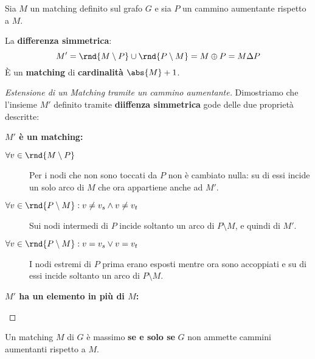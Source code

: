 \documentclass[\main/main.tex]{subfiles}
\begin{document}
\begin{theorem}
	Sia \(M\) un matching definito sul grafo \(G\) e sia \(P\) un cammino aumentante rispetto a \(M\).

	La \textbf{differenza simmetrica}:
	\[
		M' = \rnd{M\setminus P} \cup \rnd{P\setminus M} = M \oplus P = M \Delta P
	\]
	È un \textbf{matching} di \textbf{cardinalità} \(\abs{M} + 1\).
\end{theorem}

\begin{proof}[Estensione di un Matching tramite un cammino aumentante]
	Dimostriamo che l'insieme \(M'\) definito tramite \textbf{diiffenza simmetrica} gode delle due proprietà descritte:
	\begin{description}
		\item \textbf{\(M'\) è un matching:}
		      \begin{description}
			      \item[\(\forall v \in \rnd{M \setminus P}\)] Per i nodi che non sono toccati da \(P\) non è cambiato nulla: su di essi incide un solo arco di \(M\) che ora appartiene anche ad \(M'\).
			      \item[\(\forall v \in \rnd{P \setminus M}: v\neq v_s \land v \neq v_t\)] Sui nodi intermedi di \(P\) incide soltanto un arco di \(P\setminus M\), e quindi di \(M'\).
			      \item[\(\forall v \in \rnd{P \setminus M}: v= v_s \lor v = v_t\)] I nodi estremi di \(P\) prima erano esposti mentre ora sono accoppiati e su di essi incide soltanto un arco di \(P\setminus M\).
		      \end{description}
		\item \textbf{\(M'\) ha un elemento in più di \(M\):}
	\end{description}
\end{proof}
\clearpage
\begin{theorem}
	Un matching \(M\) di \(G\) è massimo \textbf{se e solo se} \(G\) non ammette cammini aumentanti rispetto a \(M\).
\end{theorem}
\end{document}
